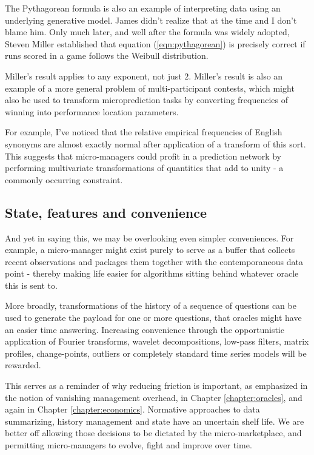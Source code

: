 The Pythagorean formula is also an example of interpreting data using an underlying generative model. James didn't realize that at the time and I don't blame him. Only much later, and well after the formula was widely adopted, Steven Miller established that equation (\ref{eqn:pythagorean}) is precisely correct if runs scored in a game follows the Weibull distribution. 

Miller's result applies to any exponent, not just $2$. Miller's result is also an example of a more general problem of multi-participant contests, which might also be used to transform microprediction tasks by converting frequencies of winning into performance location parameters. 

For example, I've noticed that the relative empirical frequencies of English synonyms are almost exactly normal after application of a transform of this sort. This suggests that micro-managers could profit in a prediction network by performing multivariate transformations of quantities that add to unity - a commonly occurring constraint.   

\subsection{State, features and convenience}

And yet in saying this, we may be overlooking even simpler conveniences. For example, a micro-manager might exist purely to serve as a buffer that collects recent observations and packages them together with the contemporaneous data point - thereby making life easier for algorithms sitting behind whatever oracle this is sent to. 

More broadly, transformations of the history of a sequence of questions can be used to generate the payload for one or more questions, that oracles might have an easier time answering. Increasing convenience through the opportunistic application of Fourier transforms, wavelet decompositions, low-pass filters, matrix profiles, change-points, outliers or completely standard time series models will be rewarded.

This serves as a reminder of why reducing friction is important, as emphasized in the notion of vanishing management overhead, in Chapter \ref{chapter:oracles}, and again in Chapter \ref{chapter:economics}. Normative approaches to data summarizing, history management and state have an uncertain shelf life. We are better off allowing those decisions to be dictated by the micro-marketplace, and permitting micro-managers to evolve, fight and improve over time.  

